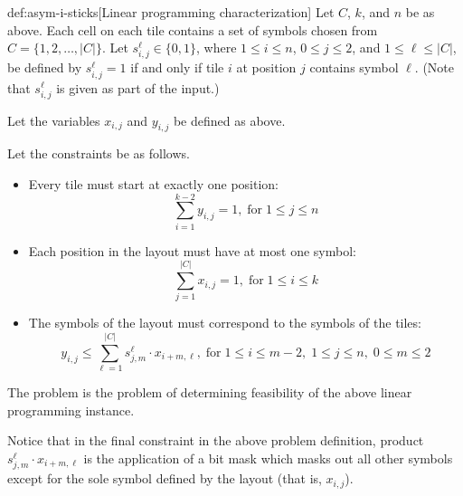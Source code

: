 \documentclass[draft]{article}
\theoremstyle{definition} \newtheorem{definition}[definition]{Definition}
\theoremstyle{definition} \newreptheorem{definition}{Definition}
\newcommand{\dash}{\mbox{-}}
\newcommand{\plain}[1]{\;\text{#1}\;}
\newcommand{\aisticks}{I\dash ASYM\dash STICKS}
\begin{document}
  \begin{repdefinition}{def:asym-i-sticks}[Linear programming characterization]
    Let $C$, $k$, and $n$ be as above. Each cell on each tile contains a set of
    symbols chosen from $C=\{1,2,\ldots,|C|\}$. Let $s^{\ell}_{i,j}\in\{0,1\}$,
    where $1\leq i\leq n$, $0\leq j\leq 2$, and $1\leq\ell\leq|C|$, be defined
    by $s^{\ell}_{i,j} = 1$ if and only if tile $i$ at position $j$ contains
    symbol $\ell$. (Note that $s^{\ell}_{i, j}$ is given as part of the input.)

    Let the variables $x_{i, j}$ and $y_{i, j}$ be defined as above.
    
    Let the constraints be as follows.
    \begin{itemize}
    \item[] Every tile must start at exactly one position:
      \begin{displaymath}
        \sum_{i = 1}^{k - 2}{y_{i, j}} = 1, \plain{for} 1\leq j\leq n
      \end{displaymath}
    \item[] Each position in the layout must have at most one symbol:
      \begin{displaymath}
        \sum_{j = 1}^{|C|}{x_{i, j}} = 1, \plain{for} 1\leq i\leq k
      \end{displaymath}
    \item[] The symbols of the layout must correspond to the symbols of the
      tiles:
      \begin{displaymath}
        y_{i, j} \leq \sum_{\ell=1}^{|C|}{s^{\ell}_{j,m}\cdot x_{i+m,\ell}},
        \plain{for} 1\leq i\leq m - 2,\; 1\leq j\leq n,\; 0\leq m\leq 2
      \end{displaymath}
    \end{itemize}
    
    The \lang{\aisticks} problem is the problem of determining feasibility of
    the above linear programming instance.
  \end{repdefinition}

  Notice that in the final constraint in the above problem definition, product
  $s^{\ell}_{j,m}\cdot x_{i+m,\ell}$ is the application of a bit mask which
  masks out all other symbols except for the sole symbol defined by the layout
  (that is, $x_{i, j}$).
\end{document}
